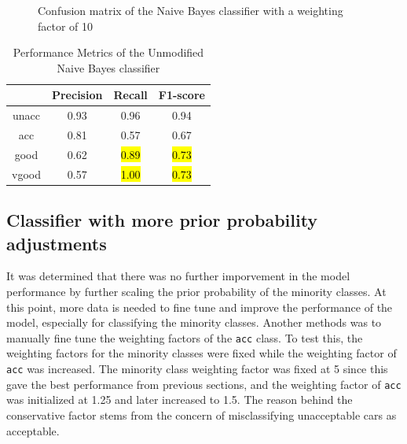 \documentclass[a4paper]{article}
\begin{document}
\begin{figure} [h]
  \caption{Confusion matrix of the Naive Bayes classifier with a weighting factor of 10} 
  \label{fig:NBCcm_10}
\end{figure}


\begin{table}[ht]
  \centering
  \caption{Performance Metrics of the Unmodified Naive Bayes classifier}
  \label{tab:nb_performance_10}
  \begin{tabular}{||cccc||}
  \hline
  \textbf{ } & \textbf{Precision} & \textbf{Recall} & \textbf{F1-score} \\
  \hline \hline
  unacc & 0.93 & 0.96 & 0.94\\ \hline
  acc  & 0.81 & 0.57 & 0.67\\ \hline
  good & 0.62 & \hl{0.89} & \hl{0.73}\\ \hline
  vgood & 0.57 & \hl{1.00} & \hl{0.73}\\ \hline
  \end{tabular}
\end{table}

\subsection{Classifier with more prior probability adjustments} 
It was determined that there was no further imporvement in the model performance by further scaling the prior probability of the minority classes. At this point, more data is needed to fine tune and improve the performance of the model, especially for classifying the minority classes. Another methods was to manually fine tune the weighting factors of the \lstinline{acc} class. To test this, the weighting factors for the minority classes were fixed while the weighting factor of \lstinline{acc} was increased. The minority class weighting factor was fixed at 5 since this gave the best performance from previous sections, and the weighting factor of \lstinline{acc} was initialized at 1.25 and later increased to 1.5. The reason behind the conservative factor stems from the concern of misclassifying unacceptable cars as acceptable.
\end{document}
